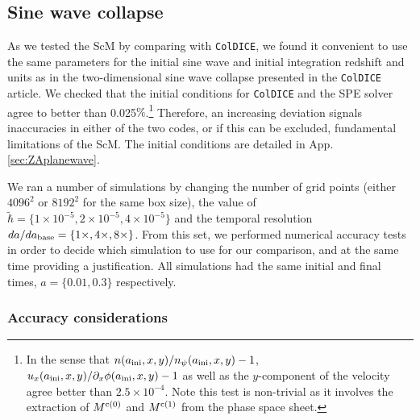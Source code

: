 \documentclass[twocolumn, nofootinbib, showpacs, superscriptaddress]{revtex4-1}
\newcommand{\thbar}{\tilde\hbar}
\renewcommand{\c}[0]{{\rm{c}}}
\begin{document}
\subsection{Sine wave collapse}\label{sec:sinewavecollapse}

As we tested the ScM by comparing with \texttt{ColDICE}, 
we found it convenient to use the same parameters 
for the initial sine wave and initial integration redshift and units as in the two-dimensional sine wave collapse presented 
in the \texttt{ColDICE} article\cite{SousbieColombi2016}. 
  We checked that the initial conditions for \texttt{ColDICE} and the SPE solver agree to better 
than 0.025$\%$.\footnote{In the sense that $n(a_{\rm ini}, x,y)/ n_\psi(a_{\rm ini},x,y) -1$,   $u_{x}(a_{\rm ini}, x,y)/ \partial_x \phi(a_{\rm ini}, x,y) -1$ as well as the $y$-component of the velocity agree better than $2.5\times10^{-4}$.
  Note this test is non-trivial as it involves the extraction of $M^{\c(0)}$ and $M^{\c(1)}$ from the phase space sheet.}
Therefore, an increasing deviation signals inaccuracies in either of the two codes, or if this can be excluded, fundamental limitations of the ScM.
The initial conditions are detailed in App.\,\ref{sec:ZAplanewave}.

We ran a number of simulations by changing the number of grid points (either $4096^2$ or $8192^2$ for the same box size), 
the value of $\thbar = \{ 1  \times 10^{-5}, 2  \times 10^{-5} , 4  \times 10^{-5} \}$ 
and the temporal resolution $da/da_{{\rm base}}= \{ 1\times, 4\times, 8\times\}$.  
From this set, we performed  numerical accuracy tests in order to decide which simulation to use for our comparison, and at the same time providing
 a justification. All simulations had the same initial and final times, $a = \{0.01,0.3\}$ respectively.

\subsubsection{Accuracy considerations}
\end{document}
